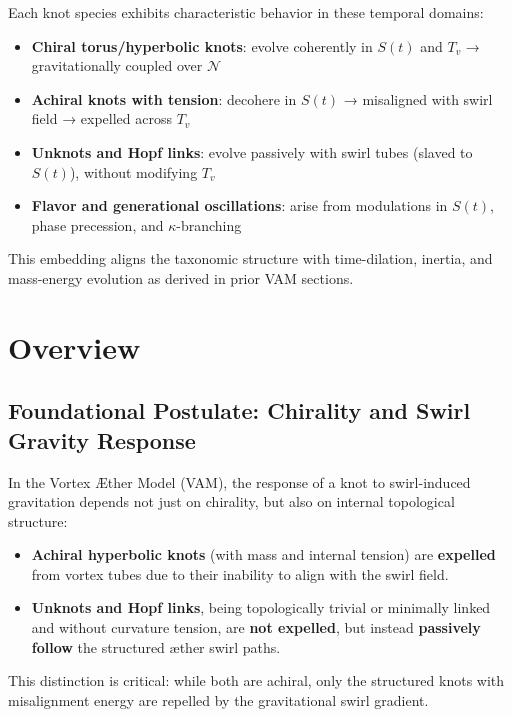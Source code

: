 \documentclass[12pt]{article}
\begin{document}
Each knot species exhibits characteristic behavior in these temporal domains:

\begin{itemize}
    \item \textbf{Chiral torus/hyperbolic knots}: evolve coherently in $S(t)$ and $T_v$ → gravitationally coupled over $\mathcal{N}$
    \item \textbf{Achiral knots with tension}: decohere in $S(t)$ → misaligned with swirl field → expelled across $T_v$
    \item \textbf{Unknots and Hopf links}: evolve passively with swirl tubes (slaved to $S(t)$), without modifying $T_v$
    \item \textbf{Flavor and generational oscillations}: arise from modulations in $S(t)$, phase precession, and $\kappa$-branching
\end{itemize}

This embedding aligns the taxonomic structure with time-dilation, inertia, and mass-energy evolution as derived in prior VAM sections.




\section*{Overview}

\subsection*{Foundational Postulate: Chirality and Swirl Gravity Response}
In the Vortex Æther Model (VAM), the response of a knot to swirl-induced gravitation depends not just on chirality, but also on internal topological structure:

\begin{itemize}
    \item \textbf{Achiral hyperbolic knots} (with mass and internal tension) are \textbf{expelled} from vortex tubes due to their inability to align with the swirl field.
    \item \textbf{Unknots and Hopf links}, being topologically trivial or minimally linked and without curvature tension, are \textbf{not expelled}, but instead \textbf{passively follow} the structured æther swirl paths.
\end{itemize}

This distinction is critical: while both are achiral, only the structured knots with misalignment energy are repelled by the gravitational swirl gradient.
\end{document}
